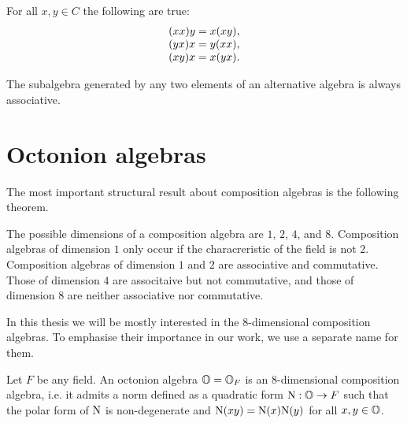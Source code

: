 \begin{lemma}
	For all $x,y \in C$ the following are true:\\
	\begin{equation}
		\begin{array}{r@{\;}c@{\;}l}
			(xx)y & = & x(xy), \\
			(yx)x & = & y(xx), \\
			(xy)x & = & x(yx).
		\end{array}
	\end{equation}
\end{lemma}

\begin{theorem}[Artin]
	The subalgebra generated by any two elements of an alternative algebra is always associative.
\end{theorem}

\section{Octonion algebras}

The most important structural result about composition algebras is the following theorem.

\begin{theorem}
	The possible dimensions of a composition algebra are $1$, $2$, $4$, and $8$. Composition 
	algebras of dimension $1$ only occur if the characreristic of the field is not $2$. 
	Composition algebras of dimension $1$ and $2$ are associative and commutative. Those
	of dimension $4$ are associtaive but not commutative, and those of dimension $8$ are
	neither associative nor commutative. 
\end{theorem}

In this thesis we will be mostly interested in the $8$-dimensional composition algebras. 
To emphasise their importance in our work, we use a separate name for them. 

\begin{definition}
	Let $F$ be any field. An octonion algebra $\mathbb{O} = \mathbb{O}_F$ is an $8$-dimensional composition
	algebra, i.e. it admits a norm defined as a quadratic form $\mathord{\mathrm{N}} : \mathbb{O} \rightarrow F$
	such that the polar form of\/ $\mathord{\mathrm{N}}$ is non-degenerate and $\mathord{\mathrm{N}}(xy) = \mathord{\mathrm{N}}(x) \mathord{\mathrm{N}}(y)$ for 
	all $x,y \in \mathbb{O}$.  
\end{definition}

